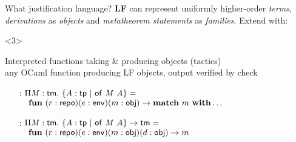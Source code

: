 \documentclass{beamer}
\theoremstyle{example}
\begin{document}
\begin{frame}{What justification language?}
  \textbf{LF} can represent uniformly higher-order \emph{terms},
  \emph{derivations} as \emph{objects} and \emph{metatheorem
    statements} as \emph{families}. \pause Extend with:
  \begin{overlayarea}\textwidth{18em}
    \begin{onlyenv}<3>
      \begin{block}{Interpreted functions} taking \& producing objects (tactics) \\
        {\footnotesize any OCaml function producing LF objects, output
          verified by \textsf{check}}
        \begin{example}
          \begin{enumerate}[inline]
          \item[\const{infer} :] $\Pi{\ensuremath{\text{\textit{M}}}}:{\text{\textsf{tm}}}.\ 
            \{{\text{\textit{A}}}:{\text{\textsf{tp}}}\ |\ {{\text{\textsf{of}}}\ {\text{\textit{M}}}\ {\text{\textit{A}}}}\} =$ \\
            {\small$\quad\mathbf{fun}\ (r : \text{\textsf{repo}}) (e :
              \text{\textsf{env}}) (m : \text{\textsf{obj}}) \to \mathbf{match}\ m\
              \mathbf{with} \ldots$}
            \\[1em]

          \item[\const{get} :] $\Pi{\ensuremath{\text{\textit{M}}}}:{\text{\textsf{tm}}}.\  \{{\text{\textit{A}}}:{\text{\textsf{tp}}}\ |\ {{\text{\textsf{of}}}\ {\text{\textit{M}}}\ {\text{\textit{A}}}}\}
            \to \text{\textsf{tm}}=$ \\
            {\small$\quad\mathbf{fun}\ (r : \text{\textsf{repo}}) (e :
              \text{\textsf{env}}) (m : \text{\textsf{obj}}) (d : \text{\textsf{obj}})\to m$}
            \\[1em]


\end{enumerate}
\end{example}
\end{block}
\end{onlyenv}
\end{overlayarea}
\end{frame}
\end{document}
